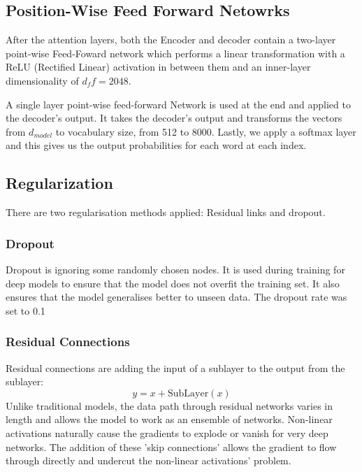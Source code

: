 \documentclass[12pt,a4paper,twoside,openright]{report}
\begin{document}
\subsection{Position-Wise Feed Forward Netowrks}
\label{fc2}
After the attention layers, both the Encoder and decoder contain a two-layer point-wise Feed-Foward network which performs a linear transformation with a ReLU (Rectified Linear) activation in between them and an inner-layer dimensionality of $d_ff=2048$.

A single layer point-wise feed-forward Network is used at the end and applied to the decoder's output. It takes the decoder's output and transforms the vectors from $d_{model}$ to vocabulary size, from 512 to 8000. Lastly, we apply a softmax layer and this gives us the output probabilities for each word at each index.

\subsection{Regularization}
\label{regularization}
There are two regularisation methods applied: Residual links and dropout.

\subsubsection{Dropout}
Dropout is ignoring some randomly chosen nodes. It is used during training for deep models to ensure that the model does not overfit the training set. It also ensures that the model generalises better to unseen data. The dropout rate was set to 0.1

\subsubsection{Residual Connections}
Residual connections are adding the input of a sublayer to the output from the sublayer:
\[ y = x + \text{SubLayer}(x)\]
Unlike traditional models, the data path through residual networks varies in length and allows the model to work as an ensemble of networks. Non-linear activations naturally cause the gradients to explode or vanish for very deep networks. The addition of these 'skip connections' allows the gradient to flow through directly and undercut the non-linear activations' problem.
\end{document}
